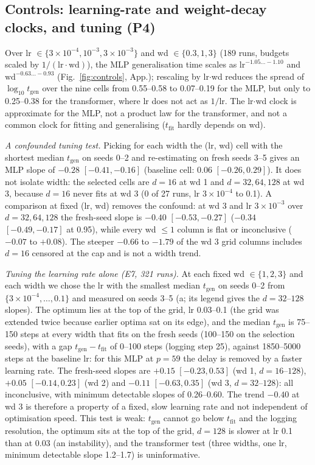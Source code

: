 \documentclass{article}
\begin{document}
\subsection{Controls: learning-rate and weight-decay clocks, and tuning (P4)}
Over lr $\in\{3\!\times\!10^{-4},10^{-3},3\!\times\!10^{-3}\}$ and wd $\in\{0.3,1,3\}$ (189 runs, budgets scaled by $1/(\mathrm{lr}\cdot\mathrm{wd})$), the MLP generalisation time scales as $\mathrm{lr}^{-1.05\ldots-1.10}$ and $\mathrm{wd}^{-0.63\ldots-0.93}$ (Fig.~\ref{fig:controls}, App.); rescaling by lr$\cdot$wd reduces the spread of $\log_{10}t_{\mathrm{gen}}$ over the nine cells from 0.55--0.58 to 0.07--0.19 for the MLP, but only to 0.25--0.38 for the transformer, where lr does not act as $1/\mathrm{lr}$. The lr$\cdot$wd clock is approximate for the MLP, not a product law for the transformer, and not a common clock for fitting and generalising ($t_{\mathrm{fit}}$ hardly depends on wd).

\emph{A confounded tuning test.} Picking for each width the (lr, wd) cell with the shortest median $t_{\mathrm{gen}}$ on seeds 0--2 and re-estimating on fresh seeds 3--5 gives an MLP slope of $-0.28$ $[-0.41,-0.16]$ (baseline cell: $0.06$ $[-0.26,0.29]$). It does not isolate width: the selected cells are $d=16$ at wd 1 and $d=32,64,128$ at wd 3, because $d=16$ never fits at wd 3 (0 of 27 runs, lr $3\!\times\!10^{-4}$ to 0.1). A comparison at fixed (lr, wd) removes the confound: at wd 3 and lr $3\!\times\!10^{-3}$ over $d=32,64,128$ the fresh-seed slope is $-0.40$ $[-0.53,-0.27]$ ($-0.34$ $[-0.49,-0.17]$ at 0.95), while every wd $\le1$ column is flat or inconclusive ($-0.07$ to $+0.08$). The steeper $-0.66$ to $-1.79$ of the wd 3 grid columns includes $d=16$ censored at the cap and is not a width trend.

\emph{Tuning the learning rate alone (E7, 321 runs).} At each fixed wd $\in\{1,2,3\}$ and each width we chose the lr with the smallest median $t_{\mathrm{gen}}$ on seeds 0--2 from $\{3\!\times\!10^{-4},\ldots,0.1\}$ and measured on seeds 3--5 (a; its legend gives the $d=32$--$128$ slopes). The optimum lies at the top of the grid, lr 0.03--0.1 (the grid was extended twice because earlier optima sat on its edge), and the median $t_{\mathrm{gen}}$ is 75--150 steps at every width that fits on the fresh seeds (100--150 on the selection seeds), with a gap $t_{\mathrm{gen}}-t_{\mathrm{fit}}$ of 0--100 steps (logging step 25), against 1850--5000 steps at the baseline lr: for this MLP at $p=59$ the delay is removed by a faster learning rate. The fresh-seed slopes are $+0.15$ $[-0.23,0.53]$ (wd 1, $d=16$--$128$), $+0.05$ $[-0.14,0.23]$ (wd 2) and $-0.11$ $[-0.63,0.35]$ (wd 3, $d=32$--$128$): all inconclusive, with minimum detectable slopes of 0.26--0.60. The trend $-0.40$ at wd 3 is therefore a property of a fixed, slow learning rate and not independent of optimisation speed. This test is weak: $t_{\mathrm{gen}}$ cannot go below $t_{\mathrm{fit}}$ and the logging resolution, the optimum sits at the top of the grid, $d=128$ is slower at lr 0.1 than at 0.03 (an instability), and the transformer test (three widths, one lr, minimum detectable slope 1.2--1.7) is uninformative.
\end{document}
